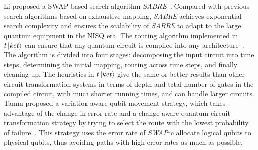 \documentclass[runningheads]{llncs}
\begin{document}
Li proposed a SWAP-based search algorithm \textit{SABRE}~\cite{Li2018}. Compared with previous search algorithms based on exhaustive mapping, \textit{SABRE} achieves exponential search complexity and ensures the scalability of \textit{SABRE} to adapt to the large quantum equipment in the NISQ era. The routing algorithm implemented in $t\left\vert{ket}\right\rangle$ can ensure that any quantum circuit is compiled into any architecture~\cite{Cowtan2019}. The algorithm is divided into four stages: decomposing the input circuit into time steps, determining the initial mapping, routing across time steps, and finally cleaning up. The heuristics in $t\left\vert{ket}\right\rangle$ give the same or better results than other circuit transformation systems in terms of depth and total number of gates in the compiled circuit, with much shorter running times, and can handle larger circuits. Tannu proposed a variation-aware qubit movement strategy, which takes advantage of the change in error rate and a change-aware quantum circuit transformation strategy by trying to select the route with the lowest probability of failure~\cite{Tannu2019}. This strategy uses the error rate of \textit{SWAP}to allocate logical qubits to physical qubits, thus avoiding paths with high error rates as much as possible.
\end{document}
